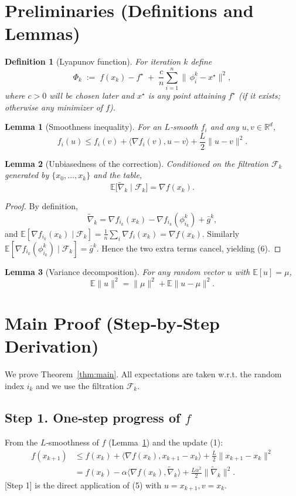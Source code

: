 \documentclass{article}
\newtheorem{lemma}{Lemma}
\newtheorem{definition}{Definition}
\newcommand{\E}{\mathbb{E}}
\newcommand{\R}{\mathbb{R}}
\begin{document}
\section*{Preliminaries (Definitions and Lemmas)}
\begin{definition}[Lyapunov function]
For iteration $k$ define
\[
\Phi_k\;:=\; f(x_k)-f^{\star}
\;+\;
\frac{c}{n}\sum_{i=1}^{n}\|\,\phi_i^{k}-x^{\star}\|^{2},
\tag{4}
\]
where $c>0$ will be chosen later and $x^{\star}$ is any point attaining $f^{\star}$ (if it exists; otherwise any minimizer of $f$).
\end{definition}
\begin{lemma}[Smoothness inequality]\label{lem:smooth}
For an $L$‑smooth $f_i$ and any $u,v\in\R^{d}$,
\[
f_i(u)\le f_i(v)+\langle\nabla f_i(v),u-v\rangle+\frac{L}{2}\|u-v\|^{2}.
\tag{5}
\]
\end{lemma}
\begin{lemma}[Unbiasedness of the correction]\label{lem:unbiased}
Conditioned on the filtration $\mathcal{F}_k$ generated by $\{x_0,\dots,x_k\}$ and the table,
\[
\E\!\bigl[\widetilde{\nabla}_k\mid\mathcal{F}_k\bigr]
= \nabla f(x_k).
\tag{6}
\]
\end{lemma}
\begin{proof}
By definition,
\[
\widetilde{\nabla}_k
= \nabla f_{i_k}(x_k)-\nabla f_{i_k}(\phi_{i_k}^{k})+\bar g^{k},
\]
and $\E[\nabla f_{i_k}(x_k)\mid\mathcal{F}_k]=\frac1n\sum_i\nabla f_i(x_k)=\nabla f(x_k)$.
Similarly $\E[\nabla f_{i_k}(\phi_{i_k}^{k})\mid\mathcal{F}_k]=\bar g^{k}$.
Hence the two extra terms cancel, yielding (6). \qedhere
\end{proof}
\begin{lemma}[Variance decomposition]\label{lem:var}
For any random vector $u$ with $\E[u]=\mu$,
\[
\E\|u\|^{2}= \|\mu\|^{2}+ \E\|u-\mu\|^{2}.
\tag{7}
\]
\end{lemma}

\section*{Main Proof (Step‑by‑Step Derivation)}
We prove Theorem~\ref{thm:main}. All expectations are taken w.r.t. the random index $i_k$ and we use the filtration $\mathcal{F}_k$.

\subsection*{Step 1. One‑step progress of $f$}
From the $L$‑smoothness of $f$ (Lemma~\ref{lem:smooth}) and the update (1):
\begin{align}
f(x_{k+1})
&\le f(x_k)+\langle\nabla f(x_k),x_{k+1}-x_k\rangle
   +\frac{L}{2}\|x_{k+1}-x_k\|^{2} \nonumber\\
&= f(x_k)-\alpha\langle\nabla f(x_k),\widetilde{\nabla}_k\rangle
   +\frac{L\alpha^{2}}{2}\|\widetilde{\nabla}_k\|^{2}. \tag{8}
\end{align}
[Step 1] is the direct application of (5) with $u=x_{k+1},v=x_k$.
\end{document}
